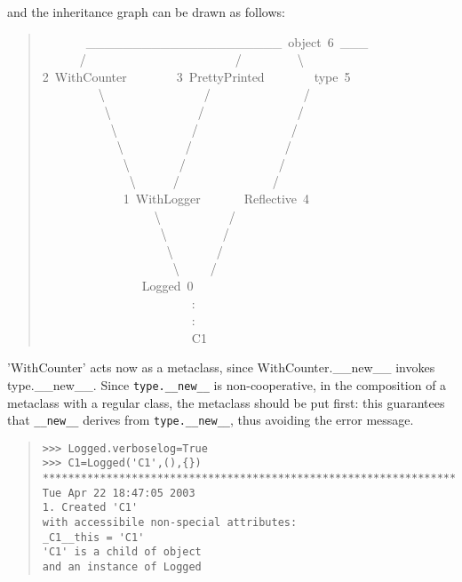 \documentclass[10pt,english]{article}
\begin{document}
and the inheritance graph can be drawn as follows:
\begin{quote}
\begin{ttfamily}\begin{flushleft}
\mbox{~~~~~~~{\_}{\_}{\_}{\_}{\_}{\_}{\_}{\_}{\_}{\_}{\_}{\_}{\_}{\_}{\_}{\_}{\_}{\_}{\_}{\_}{\_}~object~6~{\_}{\_}{\_}}\\
\mbox{~~~~~~/~~~~~~~~~~~~~~~~~~~~~~~~/~~~~~~~~~{\textbackslash}}\\
\mbox{2~WithCounter~~~~~~~~3~PrettyPrinted~~~~~~~~type~5}\\
\mbox{~~~~~~~~~{\textbackslash}~~~~~~~~~~~~~~~~/~~~~~~~~~~~~~~~/}\\
\mbox{~~~~~~~~~~{\textbackslash}~~~~~~~~~~~~~~/~~~~~~~~~~~~~~~/}\\
\mbox{~~~~~~~~~~~{\textbackslash}~~~~~~~~~~~~/~~~~~~~~~~~~~~~/}\\
\mbox{~~~~~~~~~~~~{\textbackslash}~~~~~~~~~~/~~~~~~~~~~~~~~~/}\\
\mbox{~~~~~~~~~~~~~{\textbackslash}~~~~~~~~/~~~~~~~~~~~~~~~/}\\
\mbox{~~~~~~~~~~~~~~{\textbackslash}~~~~~~/~~~~~~~~~~~~~~~/}\\
\mbox{~~~~~~~~~~~~~1~WithLogger~~~~~~~Reflective~4}\\
\mbox{~~~~~~~~~~~~~~~~~~{\textbackslash}~~~~~~~~~~~/}\\
\mbox{~~~~~~~~~~~~~~~~~~~{\textbackslash}~~~~~~~~~/}\\
\mbox{~~~~~~~~~~~~~~~~~~~~{\textbackslash}~~~~~~~/}\\
\mbox{~~~~~~~~~~~~~~~~~~~~~{\textbackslash}~~~~~/}\\
\mbox{~~~~~~~~~~~~~~~~Logged~0}\\
\mbox{~~~~~~~~~~~~~~~~~~~~~~~~:}\\
\mbox{~~~~~~~~~~~~~~~~~~~~~~~~:}\\
\mbox{~~~~~~~~~~~~~~~~~~~~~~~~C1}
\end{flushleft}\end{ttfamily}
\end{quote}

'WithCounter' acts now as a metaclass, since WithCounter.{\_}{\_}new{\_}{\_} invokes
type.{\_}{\_}new{\_}{\_}. Since \texttt{type.{\_}{\_}new{\_}{\_}} is non-cooperative,
in the composition of a metaclass with a regular class, the metaclass
should be put first: this guarantees that \texttt{{\_}{\_}new{\_}{\_}} derives from
\texttt{type.{\_}{\_}new{\_}{\_}}, thus avoiding the error message.
\begin{quote}
\begin{verbatim}>>> Logged.verboselog=True
>>> C1=Logged('C1',(),{})
*****************************************************************************
Tue Apr 22 18:47:05 2003
1. Created 'C1'
with accessibile non-special attributes:
_C1__this = 'C1'
'C1' is a child of object
and an instance of Logged\end{verbatim}
\end{quote}
\end{document}
